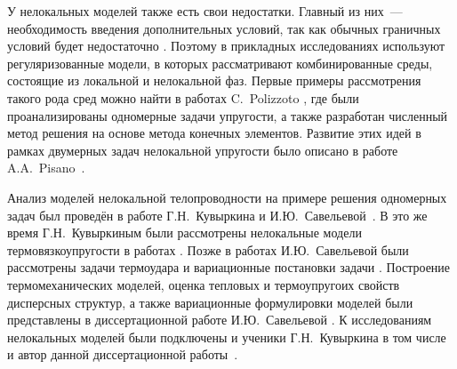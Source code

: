 \ifsynopsis
\else
У нелокальных моделей также есть свои недостатки. Главный из них~--- необходимость введения дополнительных условий, так как обычных граничных условий будет недостаточно \cite{Pisano2}. Поэтому в прикладных исследованиях используют регуляризованные модели, в которых рассматривают комбинированные среды, состоящие из локальной и нелокальной фаз. Первые примеры рассмотрения такого рода сред можно найти в работах C.~Polizzoto \cite{Polizzotto1, Polizzotto2}, где были проанализированы одномерные задачи упругости, а также разработан численный метод решения на основе метода конечных элементов. Развитие этих идей в рамках двумерных задач нелокальной упругости было описано в работе A.A.~Pisano~\cite{Pisano1}.
\fi

\ifsynopsis
\else
Анализ моделей нелокальной телопроводности на примере решения одномерных задач был проведён в работе Г.Н.~Кувыркина и И.Ю.~Савельевой~\cite{NonlocalThermal1}. В это же время Г.Н.~Кувыркиным были рассмотрены нелокальные модели термовязкоупругости в работах \cite{ThermoViscoElasticity1, ThermoViscoElasticity2, ThermoViscoElasticity3}. Позже в работах И.Ю.~Савельевой были рассмотрены задачи термоудара \cite{ThermoUdar1, ThermoUdar2} и вариационные постановки задачи \mbox{\cite{NonlocalThermalVariation1, NonlocalThermalVariation2}}. Построение термомеханических моделей, оценка тепловых и термоупругоих свойств дисперсных структур, а также вариационные формулировки моделей были представлены в диссертационной работе И.Ю.~Савельевой \cite{SavelievaDisser}. К исследованиям нелокальных моделей были подключены и ученики Г.Н.~Кувыркина в том числе и автор данной диссертационной работы~\mbox{\cite{AMCSM2019, ZAMM, NonlocalSaintVenant, NonlocalRadiation, KirshProblem}.}
\fi

